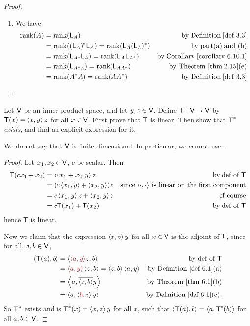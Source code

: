 \begin{proof}
\begin{enumerate}
\item We have
\begin{align*}
    \rank(A) & = \rank(\LMTRAN_A) & \text{by \DEF{3.3}} \\
        & = \rank((\LMTRAN_A)^* \LMTRAN_A) = \rank(\LMTRAN_A (\LMTRAN_A)^*) & \text{by part(a) and (b)} \\
        & = \rank(\LMTRAN_{A^*} \LMTRAN_A) = \rank(\LMTRAN_A \LMTRAN_{A^*}) & \text{by \CORO{6.10.1}} \\
        & = \rank(\LMTRAN_{A^* A}) = \rank(\LMTRAN_{A A^*}) & \text{by \THM{2.15}(e)} \\
        & = \rank(A^* A) = \rank(A A^*) & \text{by \DEF{3.3}}
\end{align*}
\end{enumerate}
\end{proof}

\begin{exercise} \label{exercise 6.3.14}
Let \(\textsf{V}\) be an inner product space, and let \(y, z \in \textsf{V}\).
Define \(\textsf{T} : \textsf{V} \to \textsf{V}\) by \(\textsf{T}(x) = \left< x, y \right> z\) for all \(x \in \textsf{V}\).
First prove that \(\textsf{T}\) is linear.
Then show that \(\textsf{T}^*\) \emph{exists}, and find an explicit expression for it.
\end{exercise}

\begin{note}
We do not say that \(\textsf{V}\) is finite dimensional.
In particular, we cannot use .
\end{note}

\begin{proof}
Let \(x_1, x_2 \in \textsf{V}\), \(c\) be scalar.
Then
\begin{align*}
    \textsf{T}(c x_1 + x_2) & = \left< c x_1 + x_2, y \right> z & \text{by def of \(\textsf{T}\)} \\
        & = (c \left< x_1, y \right> + \left< x_2, y \right>) z & \text{since \(\left<\cdot, \cdot \right>\) is linear on the first component} \\
        & = c \left< x_1, y \right> z + \left< x_2, y \right> z & \text{of course} \\
        & = c \textsf{T}(x_1) + \textsf{T}(x_2) & \text{by def of \(\textsf{T}\)}
\end{align*}
hence \(\textsf{T}\) is linear.

Now we claim that the expression \(\left< x, z \right> y\) for all \(x \in \textsf{V}\) is the adjoint of \(\textsf{T}\), since for all, \(a, b \in \textsf{V}\),
\begin{align*}
    \LG \T(a), b \RG & = \LG \MAROON{\LG a, y \RG} z, b \RG & \text{by def of \(\T\)} \\
        & = \MAROON{\LG a, y \RG} \LG z, b \RG = \LG z, b \RG \LG a, y \RG & \text{by \DEF{6.1}(a)} \\
        & = \LG a, \conjugatet{\LG z, b \RG} y \RG & \text{by \THM{6.1}(b)} \\
        & = \LG a, \LG \RED{b}, z \RG y \RG & \text{by \DEF{6.1}(c)},
\end{align*}
So \(\textsf{T}^*\) exists and is \(\textsf{T}^*(x) = \left< x, z \right> y\) for all \(x\), such that \(\left< \textsf{T}(a), b \right> = \left< a, \textsf{T}^*(b) \right>\) for all \(a, b \in \textsf{V}\).
\end{proof}

